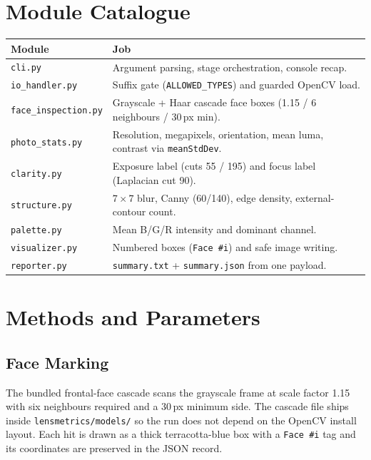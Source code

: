 \documentclass[11pt,a4paper]{article}
\begin{document}
\section{Module Catalogue}
\begin{center}
\small
\renewcommand{\arraystretch}{1.25}
\begin{tabularx}{\textwidth}{p{3.6cm}X}
\toprule
\textbf{Module} & \textbf{Job} \\
\midrule
\texttt{cli.py} & Argument parsing, stage orchestration, console recap. \\
\texttt{io\_handler.py} & Suffix gate (\texttt{ALLOWED\_TYPES}) and guarded OpenCV load. \\
\texttt{face\_inspection.py} & Grayscale + Haar cascade face boxes (1.15 / 6 neighbours / 30\,px min). \\
\texttt{photo\_stats.py} & Resolution, megapixels, orientation, mean luma, contrast via \texttt{meanStdDev}. \\
\texttt{clarity.py} & Exposure label (cuts 55 / 195) and focus label (Laplacian cut 90). \\
\texttt{structure.py} & $7\times7$ blur, Canny (60/140), edge density, external-contour count. \\
\texttt{palette.py} & Mean B/G/R intensity and dominant channel. \\
\texttt{visualizer.py} & Numbered boxes (\texttt{Face \#i}) and safe image writing. \\
\texttt{reporter.py} & \texttt{summary.txt} + \texttt{summary.json} from one payload. \\
\bottomrule
\end{tabularx}
\end{center}

\section{Methods and Parameters}
\subsection{Face Marking}
The bundled frontal-face cascade scans the grayscale frame at scale factor
1.15 with six neighbours required and a 30\,px minimum side. The cascade file
ships inside \texttt{lensmetrics/models/} so the run does not depend on the
OpenCV install layout. Each hit is drawn as a thick terracotta-blue box with a
\texttt{Face \#i} tag and its coordinates are preserved in the JSON record.
\end{document}
